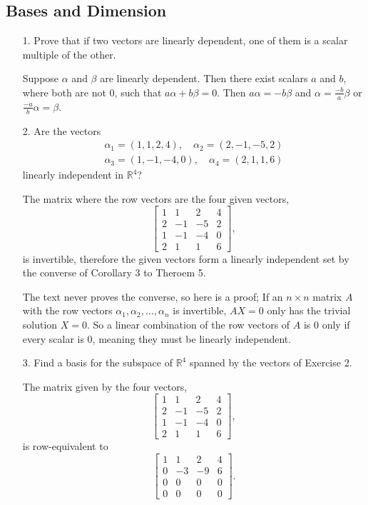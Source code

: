 \documentclass{article}
\begin{document}
\subsection{Bases and Dimension}
\begin{enumerate}[listparindent=\parindent]
\item[1.] Prove that if two vectors are linearly dependent, one of them is a scalar multiple of the other.

    Suppose \(\alpha\) and \(\beta\) are linearly dependent. Then there exist scalars \(a\) and \(b\), where both are not 0,
    such that \(a\alpha + b\beta = 0\). Then \(a\alpha = -b\beta\) and \(\alpha = \frac{-b}{a}\beta\) or \(\frac{-a}{b}\alpha = \beta\).

\item[2.] Are the vectors
    \begin{gather*}
        \alpha_1 = (1, 1, 2, 4),\quad \alpha_2 = (2, -1, -5, 2) \\
        \alpha_3 = (1, -1, -4, 0),\quad \alpha_4 = (2, 1, 1, 6)
    \end{gather*}
    linearly independent in \(\mathbb{R}^4\)?

The matrix where the row vectors are the four given vectors,
\[
    \begin{bmatrix}
        1 & 1 & 2 & 4 \\
        2 & -1 & -5 & 2 \\
        1 & -1 & -4 & 0 \\
        2 & 1 & 1 & 6
    \end{bmatrix},
\]
is invertible, therefore the given vectors form a linearly independent set by the converse of Corollary 3 to Theroem 5.

The text never proves the converse, so here is a proof;
If an \(n \times n\) matrix \(A\) with the row vectors \(\alpha_1, \alpha_2, \dots, \alpha_n\) is invertible,
\(AX = 0\) only has the trivial solution \(X = 0\).
So a linear combination of the row vectors of \(A\) is 0 only if every scalar is 0, meaning they must be linearly independent.

\item[3.] Find a basis for the subspace of \(\mathbb{R}^4\) spanned by the vectors of Exercise 2.

The matrix given by the four vectors,
\[
    \begin{bmatrix}
        1 & 1 & 2 & 4 \\
        2 & -1 & -5 & 2 \\
        1 & -1 & -4 & 0 \\
        2 & 1 & 1 & 6
    \end{bmatrix},
\]
is row-equivalent to
\[
    \begin{bmatrix}
        1 & 1 & 2 & 4 \\
        0 & -3 & -9 & 6 \\
        0 & 0 & 0 & 0 \\
        0 & 0 & 0 & 0
    \end{bmatrix}.
\]


\end{enumerate}
\end{document}
